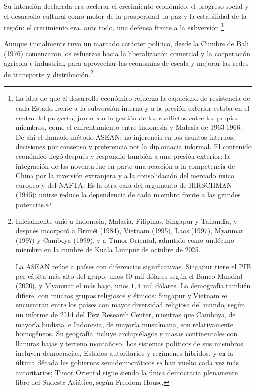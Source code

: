 \documentclass[10pt,a4paper]{article}
\begin{document}
Su intención declarada era acelerar el crecimiento económico, el progreso social y el desarrollo cultural como motor de la prosperidad, la paz y la estabilidad de la región: el crecimiento era, ante todo, una defensa frente a la subversión.\footnote{%
    La idea de que el desarrollo económico refuerza la capacidad de resistencia de cada Estado frente a la subversión interna y a la presión exterior estaba en el centro del proyecto, junto con la gestión de los conflictos entre los propios miembros, como el enfrentamiento entre Indonesia y Malasia de 1963-1966. De ahí el llamado método ASEAN: no injerencia en los asuntos internos, decisiones por consenso y preferencia por la diplomacia informal. El contenido económico llegó después y respondió también a una presión exterior: la integración de los noventa fue en parte una reacción a la competencia de China por la inversión extranjera y a la consolidación del mercado único europeo y del NAFTA. Es la otra cara del argumento de HIRSCHMAN (1945): unirse reduce la dependencia de cada miembro frente a las grandes potencias.
} 

Aunque inicialmente tuvo un marcado carácter político, desde la Cumbre de Bali (1976) comenzaron los esfuerzos hacia la liberalización comercial y la cooperación agrícola e industrial, para aprovechar las economías de escala y mejorar las redes de transporte y distribución.\footnote{%
    Inicialmente unió a Indonesia, Malasia, Filipinas, Singapur y Tailandia, y después incorporó a Brunéi (1984), Vietnam (1995), Laos (1997), Myanmar (1997) y Camboya (1999), y a Timor Oriental, admitido como undécimo miembro en la cumbre de Kuala Lumpur de octubre de 2025.

    La ASEAN reúne a países con diferencias significativas. Singapur tiene el PIB per cápita más alto del grupo, unos $60$ mil dólares según el Banco Mundial (2020), y Myanmar el más bajo, unos $1,4$ mil dólares. La demografía también difiere, con muchos grupos religiosos y étnicos: Singapur y Vietnam se encuentran entre los países con mayor diversidad religiosa del mundo, según un informe de 2014 del Pew Research Center, mientras que Camboya, de mayoría budista, e Indonesia, de mayoría musulmana, son relativamente homogéneos. Su geografía incluye archipiélagos y masas continentales con llanuras bajas y terreno montañoso. Los sistemas políticos de sus miembros incluyen democracias, Estados autoritarios y regímenes híbridos, y en la última década los gobiernos semidemocráticos se han vuelto cada vez más autoritarios; Timor Oriental sigue siendo la única democracia plenamente libre del Sudeste Asiático, según Freedom House.
}
\end{document}
